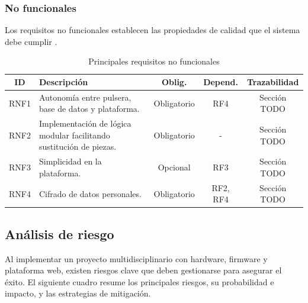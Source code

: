 \documentclass[12pt, a4paper]{article}
\begin{document}
	
	
		\subsubsection{No funcionales}
		
		Los requisitos no funcionales establecen las propiedades de calidad que el sistema debe cumplir \cite{ieee830}.
		
		\begin{table}[ht]
			\centering
			\caption{Principales requisitos no funcionales}
			\label{tab:req-no-funcionales}
			\begin{tabular}{|c|p{6cm}|c|c|c|}
				\hline
				\textbf{ID} & \textbf{Descripción} & \textbf{Oblig.} & \textbf{Depend.} & \textbf{Trazabilidad} \\
				\hline
				RNF1 & Autonomía entre pulsera, base de datos y plataforma. & Obligatorio & RF4 & Sección TODO \\
				\hline
				RNF2 & Implementación de lógica modular facilitando sustitución de piezas. & Obligatorio & - & Sección TODO \\
				\hline
				RNF3 & Simplicidad en la plataforma. & Opcional & RF3 & Sección TODO \\
				\hline
				RNF4 & Cifrado de datos personales. & Obligatorio & RF2, RF4 & Sección TODO \\
				\hline
			\end{tabular}
		\end{table}

	
		\subsection{Análisis de riesgo}
		Al implementar un proyecto multidisciplinario con hardware, firmware y plataforma web, existen riesgos clave que deben gestionarse para asegurar el éxito. El siguiente cuadro resume los principales riesgos, su probabilidad e impacto, y las estrategias de mitigación.
		
\end{document}
